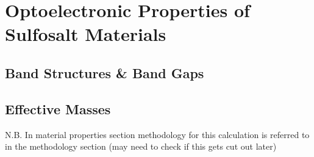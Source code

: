 \chapter{Optoelectronic Properties of Sulfosalt Materials}

\section{Band Structures \& Band Gaps}

\section{Effective Masses}
N.B. In material properties section methodology for this calculation is referred to in the methodology section (may need to check if this gets cut out later)

